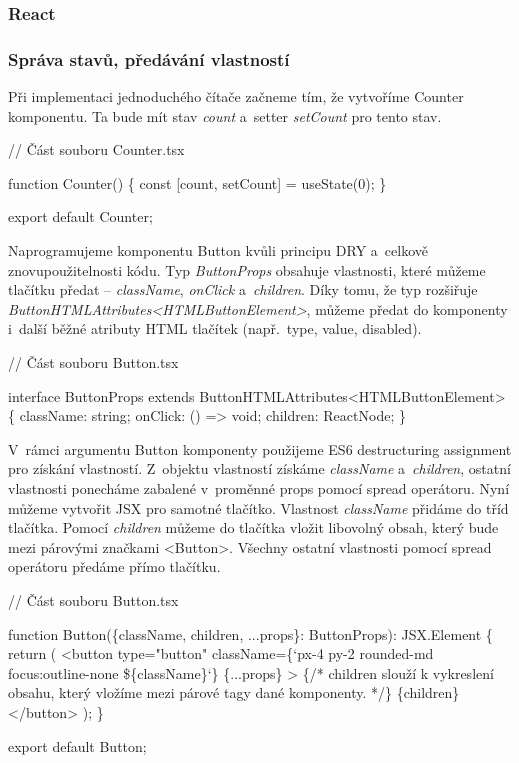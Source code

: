 \subsubsection{React}

\subsubsection*{Správa stavů, předávání vlastností}

Při implementaci jednoduchého čítače začneme tím, že vytvoříme Counter komponentu. Ta bude mít stav \emph{count} a~setter \emph{setCount} pro tento stav.

\begin{prog}
// Část souboru Counter.tsx

function Counter() \{
  const [count, setCount] = useState(0);
\}

export default Counter;
\end{prog}

Naprogramujeme komponentu Button kvůli principu DRY a~celkově znovupoužitelnosti kódu. 
Typ \emph{ButtonProps} obsahuje vlastnosti, které můžeme tlačítku předat -- \emph{className}, \emph{onClick} a~\emph{children}. 
Díky tomu, že typ rozšiřuje \emph{ButtonHTMLAttributes<HTMLButtonElement>}, můžeme předat do komponenty i~další běžné atributy HTML tlačítek (např.~type, value, disabled).

\begin{prog}
// Část souboru Button.tsx

interface ButtonProps extends ButtonHTMLAttributes<HTMLButtonElement> \{
  className: string;
  onClick: () => void;
  children: ReactNode;
\}
\end{prog}

V~rámci argumentu Button komponenty použijeme ES6 destructuring assignment pro získání vlastností. 
Z~objektu vlastností získáme \emph{className} a~\emph{children}, ostatní vlastnosti ponecháme zabalené v~proměnné props pomocí spread operátoru. 
Nyní můžeme vytvořit JSX pro samotné tlačítko. Vlastnost \emph{className} přidáme do tříd tlačítka. 
Pomocí \emph{children} můžeme do tlačítka vložit libovolný obsah, který bude mezi párovými značkami <Button>. 
Všechny ostatní vlastnosti pomocí spread operátoru předáme přímo tlačítku.

\begin{prog}
// Část souboru Button.tsx

function Button(\{className, children, ...props\}: ButtonProps): JSX.Element \{
  return (
    <button
      type="button"
      className=\{`px-4 py-2 rounded-md focus:outline-none \$\{className\}`\}
      \{...props\}
    >
      \{/* children slouží k vykreslení obsahu, 
        který vložíme mezi párové tagy dané komponenty. */\}
      \{children\}
    </button>
  );
\}

export default Button;
\end{prog}

